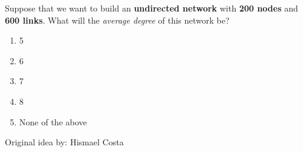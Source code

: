 
Suppose that we want to build an \textbf{undirected network} with \textbf{200 nodes} and \textbf{600 links}. What will the \textit{average degree} of this network be?

\begin{enumerate}[label={\Alph*.}]
    \item 5
    \item 6
    \item 7
    \item 8
    \item None of the above
\end{enumerate}

Original idea by: Hismael Costa
